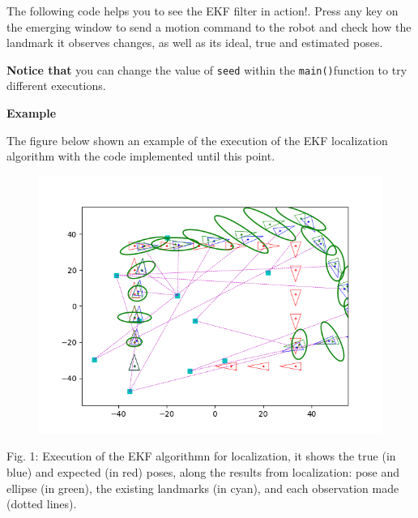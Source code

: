 \documentclass[11pt]{article}
\begin{document}
The following code helps you to see the EKF filter in action!. Press any
key on the emerging window to send a motion command to the robot and
check how the landmark it observes changes, as well as its ideal, true
and estimated poses.

\textbf{Notice that} you can change the value of \texttt{seed} within
the \texttt{main()}function to try different executions.

\textbf{Example}

The figure below shown an example of the execution of the EKF
localization algorithm with the code implemented until this point.


\begin{figure}
\centering
\includegraphics{images/fig5-2-1.png}
\end{figure}
Fig. 1: Execution of the EKF algorithmn for localization, it shows the
true (in blue) and expected (in red) poses, along the results from
localization: pose and ellipse (in green), the existing landmarks (in
cyan), and each observation made (dotted lines).
\end{document}
